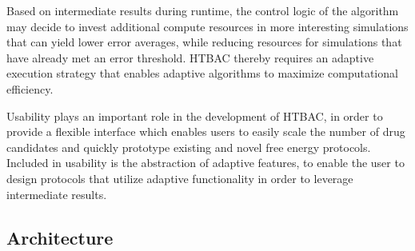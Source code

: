 


Based on intermediate results during runtime, the control logic of the
algorithm may decide to invest additional compute resources in more
interesting simulations that can yield lower error averages, while reducing
resources for simulations that have already met an error threshold. HTBAC
thereby requires an adaptive execution strategy 
 that
enables adaptive algorithms to maximize computational
efficiency.

Usability plays an important role in the development of HTBAC, in order to
provide a flexible interface which enables users to easily scale the number
of drug candidates and quickly prototype existing and novel free energy
protocols. Included in usability is the abstraction of adaptive features, to
enable the user to design protocols that utilize adaptive functionality in
order to leverage intermediate results.

\subsection{Architecture}

